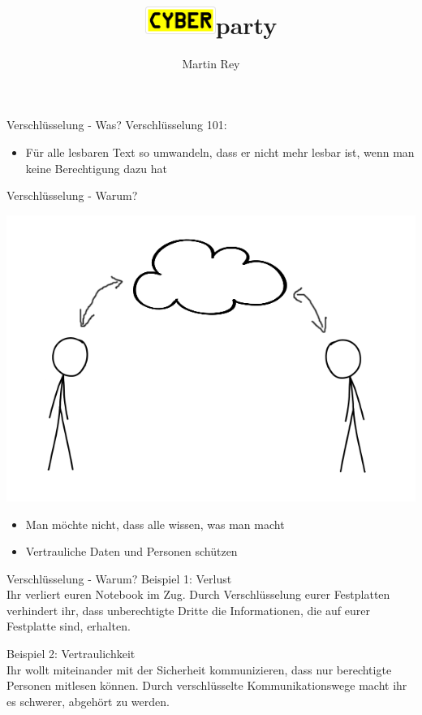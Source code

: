 \documentclass{beamer}
\title{\bf\fontsize{51.59pt}{51.59pt}\selectfont\includegraphics[align=c,height=1.2em]{cyber.png}party}
\author{Martin Rey}
\date{}
\begin{document}
\begin{frame}
    \titlepage
\end{frame}

\begin{frame}{Verschlüsselung - Was?}
	Verschlüsselung 101: 
	\begin{itemize}
		\item Für alle lesbaren Text so umwandeln, dass er nicht mehr lesbar ist, wenn man keine Berechtigung dazu hat
	\end{itemize}		
\end{frame}

\begin{frame}{Verschlüsselung - Warum?}
    \begin{center}
        \includegraphics[height=0.6\textheight]{thecloud.png}
    \end{center}
	\begin{itemize}
		\item Man möchte nicht, dass alle wissen, was man macht
		\item Vertrauliche Daten und Personen schützen
	\end{itemize}
\end{frame}

\begin{frame}{Verschlüsselung - Warum?}
	Beispiel 1: Verlust\\
	Ihr verliert euren Notebook im Zug. Durch Verschlüsselung eurer Festplatten verhindert ihr, dass unberechtigte Dritte die Informationen, die auf eurer Festplatte sind, erhalten.
	\\\hspace{1cm}
	
	Beispiel 2: Vertraulichkeit\\
	Ihr wollt miteinander mit der Sicherheit kommunizieren, dass nur berechtigte Personen mitlesen können. Durch verschlüsselte Kommunikationswege macht ihr es schwerer, abgehört zu werden.	
\end{frame}
\end{document}
